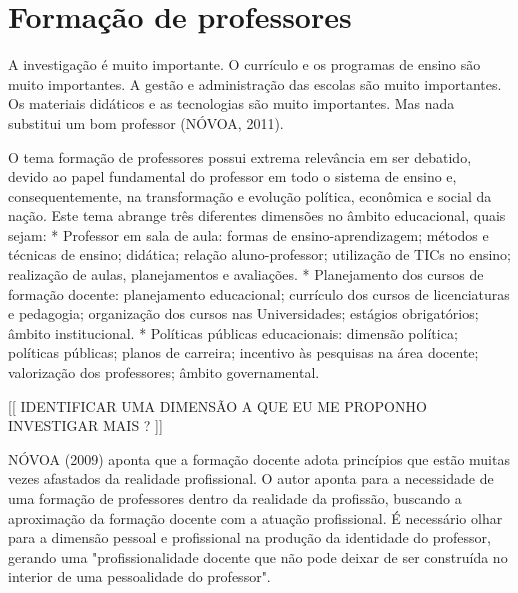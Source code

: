 \section{Formação de professores}%


	A investigação é muito importante. O currículo e os programas de ensino são muito importantes. A gestão e administração das escolas são muito importantes. Os materiais didáticos e as tecnologias são muito importantes. Mas nada substitui um bom professor (NÓVOA, 2011).
 
	
	O tema formação de professores possui extrema relevância em ser debatido, devido ao papel fundamental do professor em todo o sistema de ensino e, consequentemente, na transformação e evolução política, econômica e social da nação. Este tema abrange três diferentes dimensões no âmbito educacional, quais sejam:
	* Professor em sala de aula:  formas de ensino-aprendizagem; métodos e técnicas de ensino; didática; relação aluno-professor; utilização de TICs no ensino; realização de aulas, planejamentos e avaliações.
	* Planejamento dos cursos de formação docente: planejamento educacional; currículo dos cursos de licenciaturas e pedagogia; organização dos cursos nas Universidades; estágios obrigatórios; âmbito institucional.
	* Políticas públicas educacionais: dimensão política; políticas públicas; planos de carreira; incentivo às pesquisas na área docente; valorização dos professores; âmbito governamental.
 
[[ IDENTIFICAR UMA DIMENSÃO A QUE EU ME PROPONHO INVESTIGAR MAIS ? ]]
 
	NÓVOA (2009) aponta que a formação docente adota princípios que estão muitas vezes afastados da realidade profissional. O autor aponta para a necessidade de uma formação de professores dentro da realidade da profissão, buscando a aproximação da formação docente com a atuação profissional. É necessário olhar para a dimensão pessoal e profissional na produção da identidade do professor, gerando uma "profissionalidade docente que não pode deixar de ser construída no interior de uma pessoalidade do professor".
    
